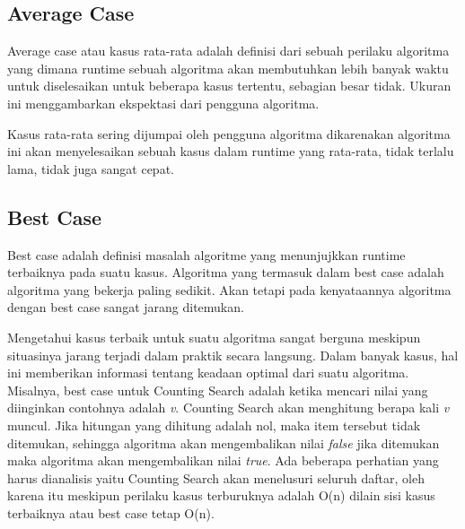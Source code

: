 \subsection{Average Case}
Average case atau kasus rata-rata adalah definisi dari sebuah perilaku algoritma yang dimana runtime sebuah algoritma akan membutuhkan lebih banyak waktu untuk diselesaikan untuk beberapa kasus tertentu, sebagian besar tidak. Ukuran ini menggambarkan ekspektasi dari pengguna algoritma.

Kasus rata-rata sering dijumpai oleh pengguna algoritma dikarenakan algoritma ini akan menyelesaikan sebuah kasus dalam runtime yang rata-rata, tidak terlalu lama, tidak juga sangat cepat.

\subsection{Best Case}
Best case adalah definisi masalah algoritme yang menunjujkkan runtime terbaiknya pada suatu kasus. Algoritma yang termasuk dalam best case adalah algoritma yang bekerja paling sedikit. Akan tetapi pada kenyataannya algoritma dengan best case sangat jarang ditemukan.

Mengetahui kasus terbaik untuk suatu algoritma sangat berguna meskipun situasinya jarang terjadi dalam praktik secara langsung. Dalam banyak kasus, hal ini memberikan informasi tentang keadaan optimal dari suatu algoritma. Misalnya, best case untuk Counting Search adalah ketika mencari nilai yang diinginkan contohnya adalah \textit{v}. Counting Search akan menghitung berapa kali \textit{v} muncul. Jika hitungan yang dihitung adalah nol, maka item tersebut tidak ditemukan, sehingga algoritma akan mengembalikan nilai \textit{false} jika ditemukan maka algoritma akan mengembalikan nilai \textit{true}. Ada beberapa perhatian yang harus dianalisis yaitu Counting Search akan menelusuri seluruh daftar, oleh karena itu meskipun perilaku kasus terburuknya adalah O(n) dilain sisi kasus terbaiknya atau best case tetap O(n).